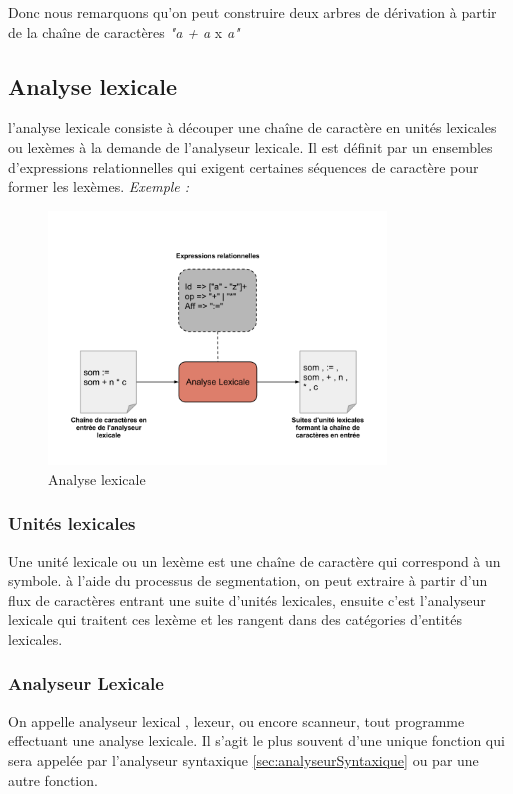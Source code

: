 \documentclass{article}
\begin{document}
Donc nous remarquons qu'on peut construire deux arbres de dérivation à partir de la chaîne de caractères 
\textit{"a + a} x \textit{a"} 

\subsection{Analyse lexicale}
l’analyse lexicale consiste à découper une chaîne de caractère en unités lexicales ou lexèmes à la demande de l’analyseur lexicale.
Il est définit par un ensembles d’expressions relationnelles qui exigent certaines séquences de caractère pour former les lexèmes.
\textit{Exemple :}

\begin{figure}[h]
	\centering
		\includegraphics[width=0.80\textwidth]{AnalyseLexicale.png}
	\caption{Analyse lexicale}
	\label{fig:AnalyseLexicale}
\end{figure}\FloatBarrier


\subsubsection{Unités lexicales}
Une unité lexicale ou un lexème est une chaîne de caractère qui correspond à un symbole. à l’aide du processus de segmentation, on peut extraire à partir d’un flux de caractères entrant une suite d’unités lexicales, ensuite c’est l’analyseur lexicale qui traitent ces lexème et les rangent dans des catégories d’entités lexicales.

\subsubsection{Analyseur Lexicale}

On appelle analyseur lexical \cite{refAnalyseurLexicale}, lexeur, ou encore scanneur, tout programme effectuant une analyse lexicale. Il s'agit le plus souvent d'une unique fonction qui sera appelée par l'analyseur syntaxique \ref{sec:analyseurSyntaxique} ou par une autre fonction.
\end{document}
